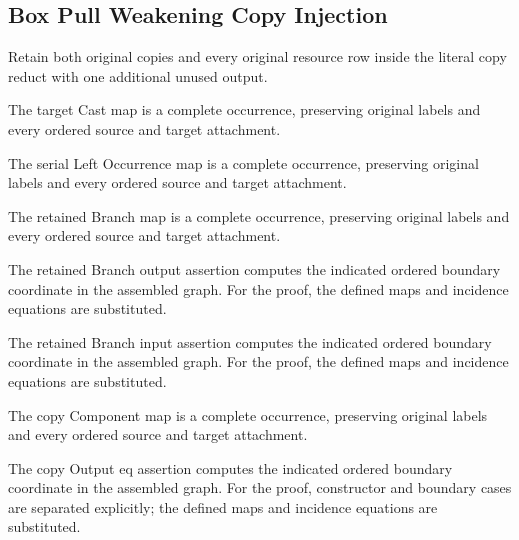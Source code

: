 \subsection{Box Pull Weakening Copy Injection}
Retain both original copies and every original resource row inside the literal copy reduct with one additional unused output.

The target Cast map is a complete occurrence, preserving original labels and every ordered source and target attachment.
\par{}

The serial Left Occurrence map is a complete occurrence, preserving original labels and every ordered source and target attachment.
\par{}

The retained Branch map is a complete occurrence, preserving original labels and every ordered source and target attachment.
\par{}

The retained Branch output assertion computes the indicated ordered boundary coordinate in the assembled graph.
For the proof, the defined maps and incidence equations are substituted.
\par{}

The retained Branch input assertion computes the indicated ordered boundary coordinate in the assembled graph.
For the proof, the defined maps and incidence equations are substituted.
\par{}

The copy Component map is a complete occurrence, preserving original labels and every ordered source and target attachment.
\par{}

The copy Output eq assertion computes the indicated ordered boundary coordinate in the assembled graph.
For the proof, constructor and boundary cases are separated explicitly; the defined maps and incidence equations are substituted.
\par{}

